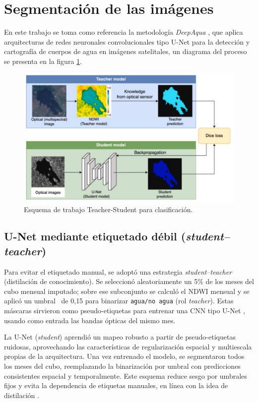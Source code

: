 \section{Segmentación de las imágenes}

En este trabajo se toma como referencia la metodología \emph{DeepAqua} \cite{DeepAqua2023}, que aplica arquitecturas de redes neuronales convolucionales tipo U-Net para la detección y cartografía de cuerpos de agua en imágenes satelitales, un diagrama del proceso se presenta en la figura \ref{fig:esq_aqua}.

\begin{figure}[ht]
        \centering
        \includegraphics[scale=.20]
        {Figures/deep_2.png}
        \caption{Esquema de trabajo Teacher-Student para clasificación.}
        \label{fig:esq_aqua}
\end{figure}

\subsection{U-Net mediante etiquetado débil (\textit{student--teacher})}
Para evitar el etiquetado manual, se adoptó una estrategia \emph{student--teacher} (distilación de conocimiento). Se seleccionó aleatoriamente un 5\% de los meses del cubo mensual imputado; sobre ese subconjunto se calculó el NDWI mensual y se aplicó un umbral \ de 0{,}15 para binarizar \texttt{agua/no agua} (rol \emph{teacher}). Estas máscaras sirvieron como pseudo-etiquetas para entrenar una CNN tipo U-Net \parencite{ronneberger2015unet}, usando como entrada las bandas ópticas del mismo mes.

La U-Net (\emph{student}) aprendió un mapeo robusto a partir de pseudo-etiquetas ruidosas, aprovechando las características  de regularización espacial y multiescala propias de la arquitectura. Una vez entrenado el modelo, se segmentaron todos los meses del cubo, reemplazando la binarización por umbral con predicciones consistentes espacial y temporalmente. Este esquema reduce sesgo por umbrales fijos y evita la dependencia de etiquetas manuales, en línea con la idea de distilación \parencite{hinton2015distilling}. 

